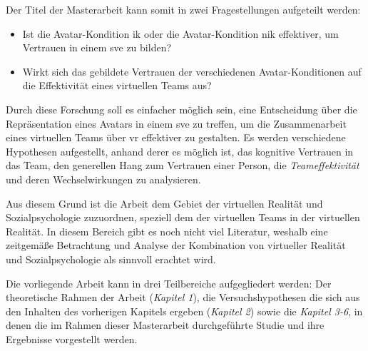 \documentclass[a4paper,11pt]{article}%
\renewcommand{\\}{\vspace*{0.5\baselineskip} \newline}
\begin{document}
Der Titel der Masterarbeit kann somit in zwei Fragestellungen aufgeteilt werden:
\begin{itemize}
\item Ist die Avatar-Kondition \ac{ik} oder die Avatar-Kondition \ac{nik} effektiver, um Vertrauen in einem \ac{sve} zu bilden?
\item Wirkt sich das gebildete Vertrauen der verschiedenen Avatar-Konditionen auf die Effektivität eines virtuellen Teams aus?
\end{itemize}

Durch diese Forschung soll es einfacher möglich sein, eine Entscheidung über die Repräsentation eines Avatars in einem \ac{sve} zu treffen, um die Zusammenarbeit eines virtuellen Teams über \ac{vr} effektiver zu gestalten.
Es werden verschiedene Hypothesen aufgestellt, anhand derer es möglich ist, das kognitive Vertrauen in das Team, den generellen Hang zum Vertrauen einer Person, die \textit{Teameffektivität} und deren Wechselwirkungen zu analysieren.

Aus diesem Grund ist die Arbeit dem Gebiet der virtuellen Realität und Sozialpsychologie zuzuordnen, speziell dem der virtuellen Teams in der virtuellen Realität.
In diesem Bereich gibt es noch nicht viel Literatur, weshalb eine zeitgemäße Betrachtung und Analyse der Kombination von virtueller Realität und Sozialpsychologie als sinnvoll erachtet wird.

Die vorliegende Arbeit kann in drei Teilbereiche aufgegliedert werden: Der theoretische Rahmen der Arbeit (\textit{Kapitel 1}), die Versuchshypothesen die sich aus den Inhalten des vorherigen Kapitels ergeben (\textit{Kapitel 2}) sowie die \textit{Kapitel 3-6}, in denen die im Rahmen dieser Masterarbeit durchgeführte Studie und ihre Ergebnisse vorgestellt werden.
\end{document}
